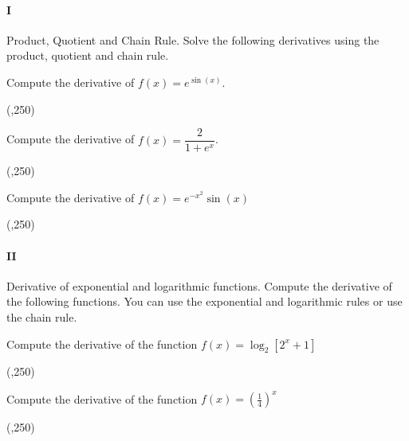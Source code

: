
\paragraph{I} Product, Quotient and Chain Rule. 
Solve the following derivatives using the product, quotient and chain rule.

\begin{preguntas}

\pregunta[16] Compute the derivative of \(f(x) = e^{\sin(x)}\).

\begin{center}
    \framebox(\textwidth,250){}   
\end{center}

\newpage

\pregunta[16] Compute the derivative of \(f(x) = \dfrac{2}{1+e^{x}}\).

\begin{center}
    \framebox(\textwidth,250){} 
\end{center}

\pregunta[16] Compute the derivative of \(f(x) = e^{-x^2}\sin(x)\)

\begin{center}
    \framebox(\textwidth,250){} 
\end{center}

\end{preguntas}

\newpage

\paragraph{II} Derivative of exponential and logarithmic functions.
Compute the derivative of the following functions.
You can use the exponential and logarithmic rules or use the chain rule.

\begin{preguntas}

\pregunta[16] Compute the derivative of the function \(f(x) = \log_{2}\left[2^x+1\right]\)

\begin{center}
    \framebox(\textwidth,250){} 
\end{center}


\pregunta[16] Compute the derivative of the function \(f(x) = \left(\frac{1}{4}\right)^{x}\)

\begin{center}
    \framebox(\textwidth,250){} 
\end{center}

\end{preguntas}



